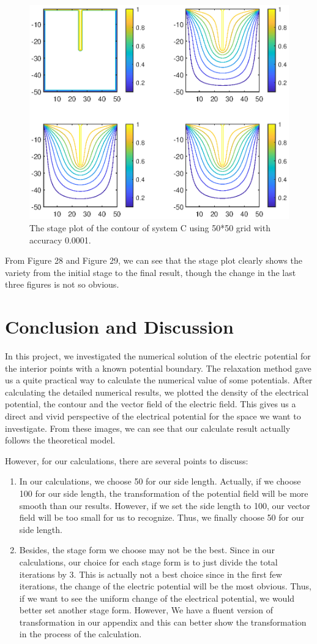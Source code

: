 \documentclass[12pt]{report}
\begin{document}
\begin{figure}[H]
    \centering
    \includegraphics[width=0.8\linewidth]{CStageContour.eps}
    \caption{The stage plot of the contour of system C using 50*50 grid with accuracy 0.0001.}
\end{figure}
From Figure 28 and Figure 29, we can see that the stage plot clearly shows the variety from the initial stage to the final result, though the change in the last three figures is not so obvious.
\section{Conclusion and Discussion}
In this project, we investigated the numerical solution of the electric potential for the interior points with a known potential boundary. The relaxation method gave us a quite practical way to calculate the numerical value of some potentials. After calculating the detailed numerical results, we plotted the density of the electrical potential, the contour and the vector field of the electric field. This gives us a direct and vivid perspective of the electrical potential for the space we want to investigate. From these images, we can see that our calculate result actually follows the theoretical model.

However, for our calculations, there are several points to discuss: 
\begin{enumerate}
    \item In our calculations, we choose 50 for our side length. Actually, if we choose 100 for our side length, the transformation of the potential field will be more smooth than our results. However, if we set the side length to 100, our vector field will be too small for us to recognize. Thus, we finally choose 50 for our side length. 
    \item Besides, the stage form we choose may not be the best. Since in our calculations, our choice for each stage form is to just divide the total iterations by 3. This is actually not a best choice since in the first few iterations, the change of the electric potential will be the most obvious. Thus, if we want to see the uniform change of the electrical potential, we would better set another stage form. However, We have a fluent version of transformation in our appendix and this can better show the transformation in the process of the calculation.
\end{enumerate}
\clearpage
\end{document}
